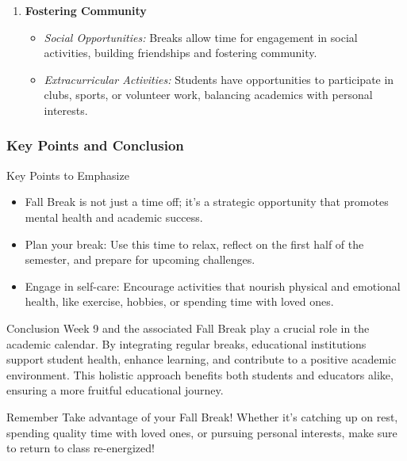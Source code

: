 \documentclass[aspectratio=169]{beamer}
\begin{document}
\begin{frame}[fragile]
\begin{enumerate}
        \item \textbf{Fostering Community}
        \begin{itemize}
            \item \textit{Social Opportunities:} Breaks allow time for engagement in social activities, building friendships and fostering community.
            \item \textit{Extracurricular Activities:} Students have opportunities to participate in clubs, sports, or volunteer work, balancing academics with personal interests.
        \end{itemize}
    \end{enumerate}
\end{frame}

\begin{frame}[fragile]
    \frametitle{Key Points and Conclusion}
    \begin{block}{Key Points to Emphasize}
        \begin{itemize}
            \item Fall Break is not just a time off; it's a strategic opportunity that promotes mental health and academic success.
            \item Plan your break: Use this time to relax, reflect on the first half of the semester, and prepare for upcoming challenges.
            \item Engage in self-care: Encourage activities that nourish physical and emotional health, like exercise, hobbies, or spending time with loved ones.
        \end{itemize}
    \end{block}

    \begin{block}{Conclusion}
        Week 9 and the associated Fall Break play a crucial role in the academic calendar. By integrating regular breaks, educational institutions support student health, enhance learning, and contribute to a positive academic environment. This holistic approach benefits both students and educators alike, ensuring a more fruitful educational journey. 
    \end{block}

    \begin{block}{Remember}
        Take advantage of your Fall Break! Whether it's catching up on rest, spending quality time with loved ones, or pursuing personal interests, make sure to return to class re-energized!
    \end{block}
\end{frame}
\end{document}

